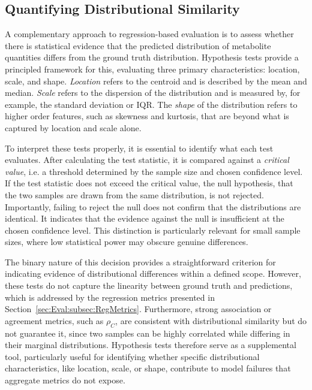 \subsection{Quantifying Distributional Similarity}
\label{sec:Eval:subsec:DistSim}
A complementary approach to regression-based evaluation is to assess whether there is statistical evidence that the predicted distribution of metabolite quantities differs from the ground truth distribution. Hypothesis tests provide a principled framework for this, evaluating three primary characteristics: location, scale, and shape. \textit{Location} refers to the centroid and is described by the mean and median. \textit{Scale} refers to the dispersion of the distribution and is measured by, for example, the standard deviation or IQR. The \textit{shape} of the distribution refers to higher order features, such as skewness and kurtosis, that are beyond what is captured by location and scale alone.

To interpret these tests properly, it is essential to identify what each test evaluates. After calculating the test statistic, it is compared against a \textit{critical value}, i.e. a threshold determined by the sample size and chosen confidence level. If the test statistic does not exceed the critical value, the null hypothesis, that the two samples are drawn from the same distribution, is not rejected. Importantly, failing to reject the null does not confirm that the distributions are identical. It indicates that the evidence against the null is insufficient at the chosen confidence level. This distinction is particularly relevant for small sample sizes, where low statistical power may obscure genuine differences.

The binary nature of this decision provides a straightforward criterion for indicating evidence of distributional differences within a defined scope. However, these tests do not capture the linearity between ground truth and predictions, which is addressed by the regression metrics presented in Section~\ref{sec:Eval:subsec:RegMetrics}. Furthermore, strong association or agreement metrics, such as $\rho_C$, are consistent with distributional similarity but do not guarantee it, since two samples can be highly correlated while differing in their marginal distributions. Hypothesis tests therefore serve as a supplemental tool, particularly useful for identifying whether specific distributional characteristics, like location, scale, or shape, contribute to model failures that aggregate metrics do not expose.

